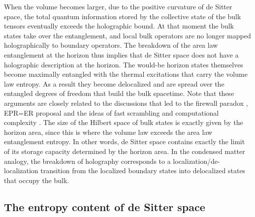 \documentclass[a4paper,12pt]{article}
\begin{document}
    
  When the volume becomes larger, due to the positive curvature of de Sitter space, the total quantum information stored by the collective state of the bulk tensors eventually exceeds the holographic bound.  At that moment the bulk states  take 
  over the entanglement, and local bulk operators are no longer mapped holographically to boundary operators. The breakdown of the area law entanglement at the horizon thus implies  that de Sitter space does not have a holographic description at the horizon.  The would-be horizon states themselves become maximally entangled with the thermal excitations that carry the volume law entropy. As a result they become delocalized and are spread over the entangled degrees of freedom that build the bulk spacetime.  Note that these arguments are closely related to the discussions that led to the firewall paradox \cite{AMPS}, EPR=ER proposal \cite{ER=EPR} and the ideas of fast scrambling \cite{FastScrambler} and computational complexity \cite{Complexity}.  The size of the Hilbert space of bulk states is exactly given by the horizon area, since this  is where the volume law   exceeds the area law   entanglement entropy. In other words, de 
  Sitter space  contains exactly the limit of its storage capacity determined by the horizon 
  area.  In the condensed matter analogy, the breakdown of holography corresponds to a localization/de-localization  transition \cite{Grover} from the localized boundary states into delocalized states that occupy the bulk. 
  
  

  








\subsection{The entropy content of de Sitter space}
\end{document}

